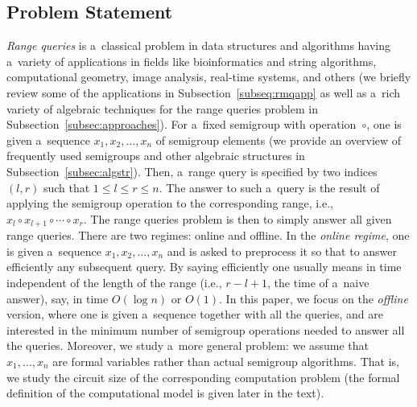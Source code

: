 \documentclass[11pt,letterpaper]{article}
\begin{document}
\subsection{Problem Statement}
{\em Range queries} is a~classical problem in data structures and algorithms having a~variety of applications in fields like bioinformatics and string algorithms, computational geometry, image analysis, real-time systems, and others (we briefly review some of the applications in Subsection~\ref{subseq:rmqapp} as well as a~rich variety of algebraic techniques for the range queries problem in Subsection~\ref{subsec:approaches}). For a~fixed semigroup with operation~$\circ$, one is given a~sequence $x_1, x_2, \dotsc, x_n$ of semigroup elements (we provide an overview of frequently used semigroups and other algebraic structures in Subsection~\ref{subsec:algstr}). Then, a~range query is specified by two indices $(l,r)$ such that $1 \le l \le r \le n$. The answer to such a~query is the result of applying the semigroup operation to the corresponding range, i.e., $x_l \circ x_{l+1} \circ \dotsb \circ x_r$. The range queries problem is then to simply answer all given range queries. There are two regimes: online and offline. In the {\em online regime}, one is given a~sequence $x_1, x_2, \dotsc, x_n$ and is asked to preprocess it so that to answer efficiently any subsequent query. By saying efficiently one usually means in time independent of the length of the range (i.e., $r-l+1$, the time of a~naive answer), say, in time $O(\log n)$ or $O(1)$. In this paper, we focus on the {\em offline} version, where one is given a~sequence together with all the queries, and are interested in the minimum number of semigroup operations needed to answer all the queries. Moreover, we study a~more general problem: we assume that $x_1, \dotsc, x_n$ are formal variables rather than actual semigroup algorithms. That is, we study the circuit size of the corresponding computation problem (the formal definition of the computational model is given later in the text).


\end{document}
